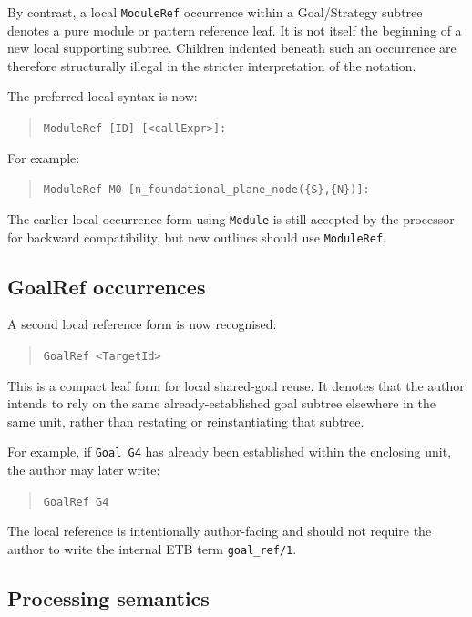 \documentclass[11pt,twoside,a4paper]{article}
\begin{document}
By contrast, a local \texttt{ModuleRef} occurrence within a Goal/Strategy subtree denotes a pure module or pattern reference leaf. It is not itself the beginning of a new local supporting subtree. Children indented beneath such an occurrence are therefore structurally illegal in the stricter interpretation of the notation.

The preferred local syntax is now:
\begin{quote}
\texttt{ModuleRef [ID] [<callExpr>]:}
\end{quote}

For example:
\begin{quote}
\texttt{ModuleRef M0 [n\_foundational\_plane\_node(\{S\},\{N\})]:}
\end{quote}

The earlier local occurrence form using \texttt{Module} is still accepted by the processor for backward compatibility, but new outlines should use \texttt{ModuleRef}.

\subsection{GoalRef occurrences}

A second local reference form is now recognised:
\begin{quote}
\texttt{GoalRef <TargetId>}
\end{quote}

This is a compact leaf form for local shared-goal reuse. It denotes that the author intends to rely on the same already-established goal subtree elsewhere in the same unit, rather than restating or reinstantiating that subtree.

For example, if \texttt{Goal G4} has already been established within the enclosing unit, the author may later write:
\begin{quote}
\texttt{GoalRef G4}
\end{quote}

The local reference is intentionally author-facing and should not require the author to write the internal ETB term \texttt{goal\_ref/1}.

\subsection{Processing semantics}
\end{document}
